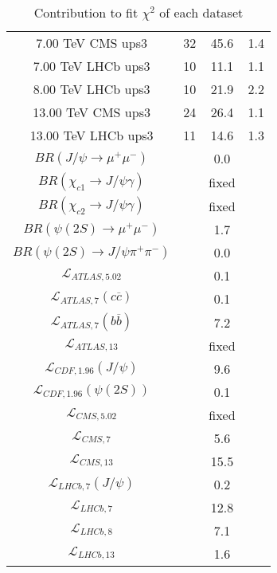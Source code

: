 \begin{table}[h!]
\begin{tabular}{c|c|c|c}
7.00 TeV CMS ups3 & 32 & 45.6 & 1.4 \\
7.00 TeV LHCb ups3 & 10 & 11.1 & 1.1 \\
8.00 TeV LHCb ups3 & 10 & 21.9 & 2.2 \\
13.00 TeV CMS ups3 & 24 & 26.4 & 1.1 \\
13.00 TeV LHCb ups3 & 11 & 14.6 & 1.3 \\
\hline
$BR(J/\psi\rightarrow\mu^+\mu^-)$ &  & 0.0 &  \\
$BR(\chi_{c1}\rightarrow J/\psi\gamma)$ &  & fixed & \\
$BR(\chi_{c2}\rightarrow J/\psi\gamma)$ &  & fixed & \\
$BR(\psi(2S)\rightarrow\mu^+\mu^-)$ &  & 1.7 &  \\
$BR(\psi(2S)\rightarrow J/\psi\pi^+\pi^-)$ &  & 0.0 &  \\
$\mathcal L_{ATLAS,5.02}$ &  & 0.1 &  \\
$\mathcal L_{ATLAS,7}(c\overline c)$ &  & 0.1 &  \\
$\mathcal L_{ATLAS,7}(b\overline b)$ &  & 7.2 &  \\
$\mathcal L_{ATLAS,13}$ &  & fixed & \\
$\mathcal L_{CDF,1.96}(J/\psi)$ &  & 9.6 &  \\
$\mathcal L_{CDF,1.96}(\psi(2S))$ &  & 0.1 &  \\
$\mathcal L_{CMS,5.02}$ &  & fixed & \\
$\mathcal L_{CMS,7}$ &  & 5.6 &  \\
$\mathcal L_{CMS,13}$ &  & 15.5 &  \\
$\mathcal L_{LHCb,7}(J/\psi)$ &  & 0.2 &  \\
$\mathcal L_{LHCb,7}$ &  & 12.8 &  \\
$\mathcal L_{LHCb,8}$ &  & 7.1 &  \\
$\mathcal L_{LHCb,13}$ &  & 1.6 &  \\
\end{tabular}
\caption{Contribution to fit $\chi^2$ of each dataset}
\end{table}
